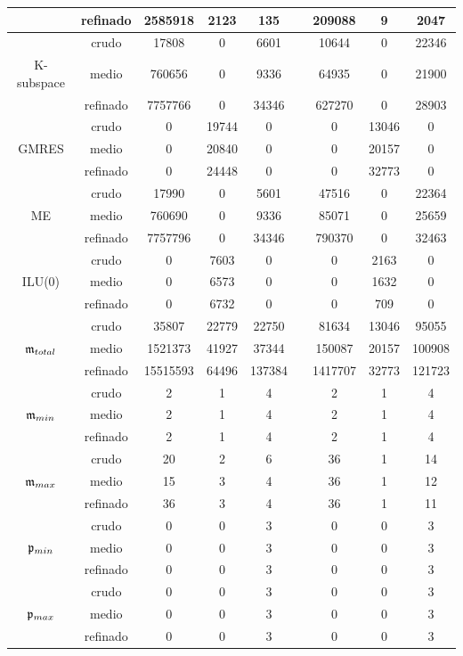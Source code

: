 \begin{table}[htb]
\begin{adjustbox}{width=0.8\columnwidth,center}
\begin{tabular}{  ccccccccc }
		& refinado & 2585918 & 2123 & 135  & & 209088 & 9 & 2047 \\
		\hline
		& crudo & 17808 & 0 & 6601  & & 10644 & 0 & 22346 \\
		K-subspace  & medio & 760656 & 0 & 9336  & & 64935 & 0 & 21900 \\
		& refinado & 7757766 & 0 & 34346  & &  627270 & 0 & 28903 \\
		\hline
		& crudo & 0 & 19744 & 0  & & 0 & 13046 & 0 \\
		GMRES  & medio & 0 & 20840 & 0  & & 0 & 20157 & 0 \\
		& refinado & 0 & 24448 & 0  & & 0 & 32773 & 0 \\
		\hline
		& crudo & 17990 & 0 & 5601  & & 47516 & 0 & 22364 \\
		ME  & medio & 760690 & 0 & 9336  & & 85071 & 0 & 25659 \\
		& refinado & 7757796 & 0 & 34346  & & 790370 & 0 & 32463 \\
		\hline
		& crudo & 0 & 7603 & 0  & & 0 & 2163 & 0 \\
		ILU(0)  & medio & 0 & 6573 & 0  & & 0 & 1632 & 0 \\
		& refinado & 0 & 6732 & 0 & &  0 & 709 & 0 \\
		\hline
		& crudo & 35807 & 22779 & 22750  & & 81634 & 13046 & 95055 \\
		$\mathfrak{m}_{total}$  & medio & 1521373 & 41927 & 37344  & & 150087 & 20157 & 100908 \\
		& refinado & 15515593 & 64496 & 137384 &  & 1417707 & 32773 & 121723 \\
		\hline
		& crudo & 2 & 1 & 4  & & 2 & 1 & 4 \\
		$\mathfrak{m}_{min}$  & medio & 2 & 1 & 4 &  & 2 & 1 & 4  \\
		& refinado & 2 & 1 & 4  & & 2 & 1 & 4 \\
		\hline
		& crudo & 20 & 2 & 6  & & 36 & 1 & 14  \\
		$\mathfrak{m}_{max}$  & medio & 15 & 3 & 4  & & 36 & 1 & 12  \\
		& refinado & 36 & 3 & 4  & & 36 & 1 & 11 \\
		\hline
		& crudo & 0 & 0 & 3  & & 0 & 0 & 3 \\
		$\mathfrak{p}_{min}$  & medio & 0 & 0 & 3  & & 0 & 0 & 3 \\
		& refinado & 0 & 0 & 3  & & 0 & 0 & 3 \\
		\hline
		& crudo & 0 & 0 & 3  & & 0 & 0 & 3 \\
		$\mathfrak{p}_{max}$  & medio & 0 & 0 & 3  & & 0 & 0 & 3 \\
		& refinado & 0 & 0 & 3  & & 0 & 0 & 3 \\
		\hline
	\end{tabular}
\end{adjustbox}
	\label{tab:num-exp-lldp-var-step:brussdnd}
\end{table}

